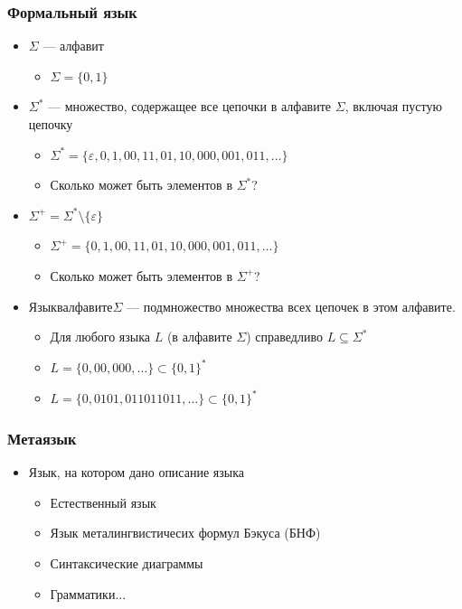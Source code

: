 \documentclass{beamer}
\begin{document}
\begin{frame}[fragile]
  \transwipe[direction=90]
  \frametitle{Формальный язык}
  \begin{itemize}
    \item $\Sigma$ --- алфавит
    \begin{itemize}
      \item $\Sigma = \{ 0, 1 \}$
    \end{itemize}
    \item $\Sigma^*$ --- множество, содержащее все цепочки в алфавите $\Sigma$, включая пустую цепочку
    \begin{itemize}
      \item $\Sigma^*=  \{ \varepsilon, 0, 1, 00, 11, 01, 10, 000, 001, 011, ... \}$
      \item Сколько может быть элементов в $\Sigma^*$?
      \pause
    \end{itemize}
    \item $\Sigma^+ = \Sigma^* \setminus \{ \varepsilon \} $ 
    \begin{itemize}
      \item $\Sigma^+ = \{0, 1, 00, 11, 01, 10, 000, 001, 011, \dots \}$
      \item Сколько может быть элементов в $\Sigma^+$?
      \pause
    \end{itemize}
    \item $Язык в алфавите \Sigma$ --- подмножество множества всех цепочек в этом алфавите. 
    \begin{itemize} 
      \item Для любого языка $L$ (в алфавите $\Sigma$) справедливо $L \subseteq \Sigma^*$
      \item $L = \{ 0, 00, 000, \dots\} \subset \{0, 1\}^*$
      \item $L = \{ 0, 0101, 011011011, \dots\} \subset \{0, 1\}^*$
    \end{itemize}
  \end{itemize}
\end{frame}

\begin{frame}[fragile]
  \transwipe[direction=90]
  \frametitle{Метаязык}
  \begin{itemize}
    \item Язык, на котором дано описание языка
    \begin{itemize}
      \item Естественный язык
      \pause
      \item Язык металингвистичесих формул Бэкуса (БНФ)
      \pause \item Синтаксические диаграммы
      \pause \item Грамматики...
    \end{itemize}
  \end{itemize}
\end{frame}
\end{document}
